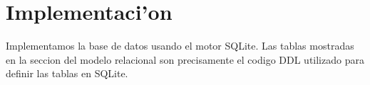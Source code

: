 \section{Implementaci'on}

Implementamos la base de datos usando el motor SQLite. Las tablas mostradas en la seccion del modelo relacional son precisamente el codigo DDL utilizado para definir las tablas en SQLite.